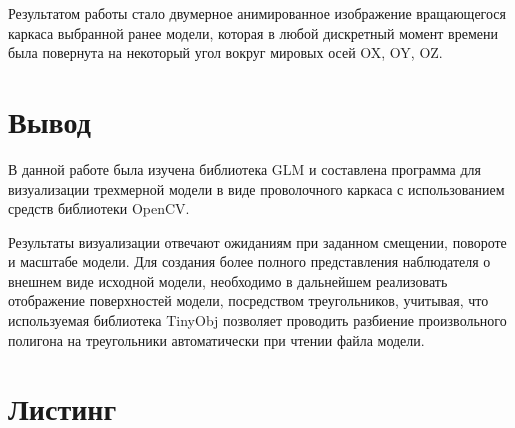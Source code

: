 \documentclass[14pt,a4paper,report]{report}
\begin{document}
Результатом работы стало двумерное анимированное изображение вращающегося каркаса выбранной ранее модели, которая в любой дискретный момент времени была повернута на некоторый угол вокруг мировых осей OX, OY, OZ.



\clearpage
\section{Вывод}
В данной работе была изучена библиотека GLM и составлена программа для визуализации трехмерной модели в виде проволочного каркаса с использованием средств библиотеки OpenCV.

Результаты визуализации отвечают ожиданиям при заданном смещении, повороте и масштабе модели. Для создания более полного представления наблюдателя о внешнем виде исходной модели, необходимо в дальнейшем реализовать отображение поверхностей модели, посредством треугольников, учитывая, что используемая библиотека TinyObj позволяет проводить разбиение произвольного полигона на треугольники автоматически при чтении файла модели.

\clearpage
\section{Листинг}

\end{document}
